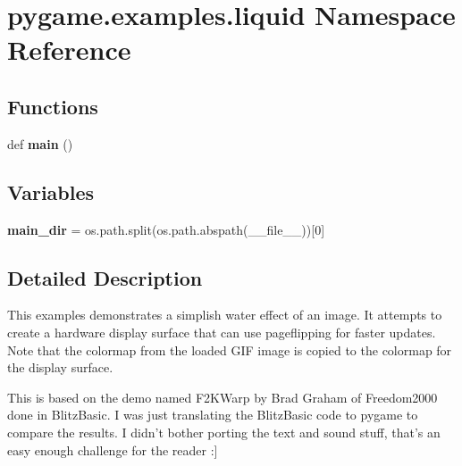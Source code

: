 \hypertarget{namespacepygame_1_1examples_1_1liquid}{}\section{pygame.\+examples.\+liquid Namespace Reference}
\label{namespacepygame_1_1examples_1_1liquid}
\subsection*{Functions}
\begin{DoxyCompactItemize}
\item 
\mbox{\label{namespacepygame_1_1examples_1_1liquid_a9c1bddf923b0b8fe96a3bd17a2af07c4}} 
def {\bfseries main} ()
\end{DoxyCompactItemize}
\subsection*{Variables}
\begin{DoxyCompactItemize}
\item 
\mbox{\label{namespacepygame_1_1examples_1_1liquid_a6e91014c47764f1b8e23ce2d707d2930}} 
{\bfseries main\+\_\+dir} = os.\+path.\+split(os.\+path.\+abspath(\+\_\+\+\_\+file\+\_\+\+\_\+))\mbox{[}0\mbox{]}
\end{DoxyCompactItemize}


\subsection{Detailed Description}
\begin{DoxyVerb}This examples demonstrates a simplish water effect of an
image. It attempts to create a hardware display surface that
can use pageflipping for faster updates. Note that the colormap
from the loaded GIF image is copied to the colormap for the
display surface.

This is based on the demo named F2KWarp by Brad Graham of Freedom2000
done in BlitzBasic. I was just translating the BlitzBasic code to
pygame to compare the results. I didn't bother porting the text and
sound stuff, that's an easy enough challenge for the reader :]\end{DoxyVerb}
 